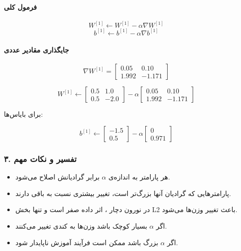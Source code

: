 \documentclass{article}
\begin{document}
\paragraph{فرمول کلی}

\[
W^{[1]} \leftarrow W^{[1]} - \alpha \nabla W^{[1]}
\]
\[
b^{[1]} \leftarrow b^{[1]} - \alpha \nabla b^{[1]}
\]

\paragraph{جایگذاری مقادیر عددی}

\[
\nabla W^{[1]}=
\begin{bmatrix}
	0.05 & 0.10 \\
	1.992 & -1.171
\end{bmatrix}
\]

\[
W^{[1]} \leftarrow
\begin{bmatrix}
	0.5 & 1.0 \\
	0.5 & -2.0
\end{bmatrix}
-
\alpha
\begin{bmatrix}
	0.05 & 0.10 \\
	1.992 & -1.171
\end{bmatrix}
\]

برای بایاس‌ها:

\[
b^{[1]} \leftarrow
\begin{bmatrix}
	-1.5 \\
	0.5
\end{bmatrix}
-
\alpha
\begin{bmatrix}
	0 \\
	0.971
\end{bmatrix}
\]

\subsubsection*{۳. تفسیر و نکات مهم}

\begin{itemize}
	\item هر پارامتر به اندازه‌ی \(\alpha\) برابر گرادیانش اصلاح می‌شود.
	\item پارامترهایی که گرادیان آنها بزرگ‌تر است، تغییر بیشتری نسبت به باقی دارند.
	\item در نورون دچار ، اثر داده صفر است و تنها بخش L2 باعث تغییر وزن‌ها می‌شود.
	\item اگر \(\alpha\) بسیار کوچک باشد وزن‌ها به کندی تغییر می‌کنند.
	\item اگر \(\alpha\) بزرگ باشد ممکن است فرآیند آموزش ناپایدار شود.
\end{itemize}
\end{document}
